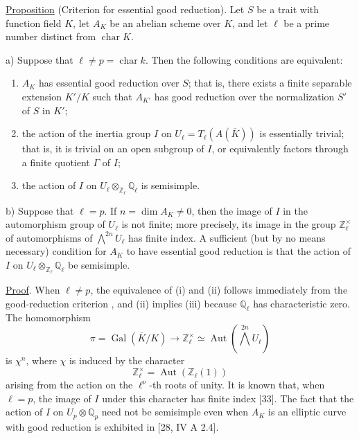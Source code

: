 \medskip
\noindent
\underline{Proposition}  (Criterion for essential good reduction).
Let $S$ be a trait with function field $K$, let $A_K$ be an abelian
scheme over $K$, and let $\ell$ be a prime number distinct from
$\operatorname{char}K$.

\smallskip
\noindent
a) Suppose that $\ell\neq p=\operatorname{char}k$. Then the following
conditions are equivalent:
\begin{enumerate}
\item[(i)] $A_K$ has essential good reduction over $S$; that is, there
  exists a finite separable extension $K'/K$ such that $A_{K'}$ has
  good reduction over the normalization $S'$ of $S$ in $K'$;
\item[(ii)] the action of the inertia group $I$ on
  $U_\ell=T_\ell(A(\overline K))$ is essentially trivial; that is, it
  is trivial on an open subgroup of $I$, or equivalently factors
  through a finite quotient $\Gamma$ of $I$;
\item[(iii)] the action of $I$ on
  $U_\ell\otimes_{\mathbb Z_\ell}\mathbb Q_\ell$ is semisimple.
\end{enumerate}

\noindent
b) Suppose that $\ell=p$. If $n=\dim A_K\neq0$, then the image of $I$
in the automorphism group of $U_\ell$ is not finite; more precisely,
its image in the group $\mathbb Z_\ell^\times$ of automorphisms of
$\bigwedge^{2n}U_\ell$ has finite index. A sufficient (but by no means
necessary) condition for $A_K$ to have essential good reduction is
that the action of $I$ on
$U_\ell\otimes_{\mathbb Z_\ell}\mathbb Q_\ell$ be semisimple.

\noindent
\underline{Proof}. When $\ell\neq p$, the equivalence of (i) and (ii)
follows immediately from the good-reduction criterion , and (ii)
implies (iii) because $\mathbb Q_\ell$ has characteristic zero. The
homomorphism
\[
 \pi=\operatorname{Gal}(\overline K/K)
 \longrightarrow \mathbb Z_\ell^\times
 \simeq\operatorname{Aut}\!\left(\bigwedge^{2n}U_\ell\right)
\]
is $\chi^n$, where $\chi$ is induced by the character
\[
 \mathbb Z_\ell^\times=\operatorname{Aut}(\mathbb Z_\ell(1))
\]
arising from the action on the $\ell^\nu$-th roots of unity. It is
known that, when $\ell=p$, the image of $I$ under this character has
finite index [33]. The fact that the action of $I$ on
$U_p\otimes\mathbb Q_p$ need not be semisimple even when $A_K$ is an
elliptic curve with good reduction is exhibited in [28, IV A 2.4].

